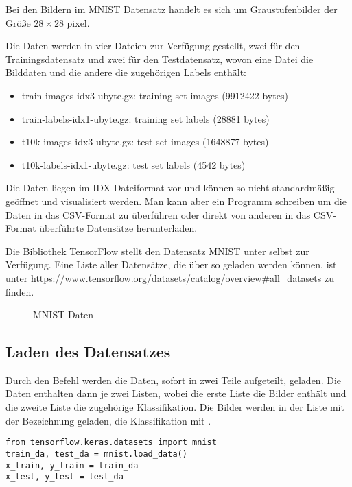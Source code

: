 Bei den Bildern im MNIST Datensatz handelt es sich um Graustufenbilder der Größe $28 \times 28$ pixel.\cite{LeCun:2013}

Die Daten werden in vier Dateien zur Verfügung gestellt, zwei für den Trainingsdatensatz und zwei für den Testdatensatz, wovon eine Datei die Bilddaten 
und die andere die zugehörigen Labels enthält:


\begin{itemize}
  \item train-images-idx3-ubyte.gz:  training set images (9912422 bytes)
  \item train-labels-idx1-ubyte.gz:  training set labels (28881 bytes)
  \item t10k-images-idx3-ubyte.gz:   test set images (1648877 bytes)
  \item t10k-labels-idx1-ubyte.gz:   test set labels (4542 bytes)
\end{itemize}

Die Daten liegen im IDX Dateiformat vor und können so nicht standardmäßig geöffnet und visualisiert werden. 
Man kann aber ein Programm schreiben um die Daten in das CSV-Format zu überführen oder direkt von anderen in das CSV-Format 
überführte Datensätze herunterladen. \cite{Redmon.04.12.2020}


Die Bibliothek TensorFlow stellt den Datensatz MNIST unter  selbst zur Verfügung. Eine Liste aller
Datensätze, die über so geladen werden können, ist unter \url{https://www.tensorflow.org/datasets/catalog/overview#all_datasets}
zu finden.


\begin{figure}
  \caption{MNIST-Daten \cite{Siddique:2019}}
\end{figure}


\subsection{Laden des Datensatzes}

Durch den Befehl  werden die Daten, sofort 
in zwei Teile aufgeteilt, geladen. Die Daten enthalten dann je zwei Listen, wobei die erste Liste die Bilder enthält und
die zweite Liste die zugehörige Klassifikation. Die Bilder werden in der Liste mit der Bezeichnung  geladen,
die Klassifikation mit .

\medskip

\begin{verbatim}
from tensorflow.keras.datasets import mnist
train_da, test_da = mnist.load_data()
x_train, y_train = train_da
x_test, y_test = test_da
\end{verbatim}


